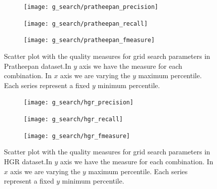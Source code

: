 \clearpage %
\begin{figure}[!htb]
    \centering
    \begin{subfigure}[t]{0.95\textwidth}
        \texttt{[image: g\_search/pratheepan\_precision]}
    \end{subfigure}
    \begin{subfigure}[t]{0.95\textwidth}
        \texttt{[image: g\_search/pratheepan\_recall]}
    \end{subfigure}
    \begin{subfigure}[t]{0.95\textwidth}
        \texttt{[image: g\_search/pratheepan\_fmeasure]}
    \end{subfigure}
    \caption[Scatter plot with the quality measures for grid search parameters in Pratheepan dataset]{Scatter plot with the quality measures for grid search parameters in Pratheepan dataset.In $y$ axis we have the measure for each combination. In $x$ axis we are varying the $y$ maximum percentile. Each series represent a fixed $y$ minimum percentile.}
    \label{fig:pratheepan_g_search}
\end{figure}


\clearpage %
\begin{figure}[!htb]
    \centering
    \begin{subfigure}[t]{0.95\textwidth}
        \texttt{[image: g\_search/hgr\_precision]}
    \end{subfigure}
    \begin{subfigure}[t]{0.95\textwidth}
        \texttt{[image: g\_search/hgr\_recall]}
    \end{subfigure}
    \begin{subfigure}[t]{0.95\textwidth}
        \texttt{[image: g\_search/hgr\_fmeasure]}
    \end{subfigure}
    \caption[Scatter plot with the quality measures for grid search parameters in HGR dataset]{Scatter plot with the quality measures for grid search parameters in HGR dataset.In $y$ axis we have the measure for each combination. In $x$ axis we are varying the $y$ maximum percentile. Each series represent a fixed $y$ minimum percentile.}
    \label{fig:hgr_g_search}
\end{figure}



